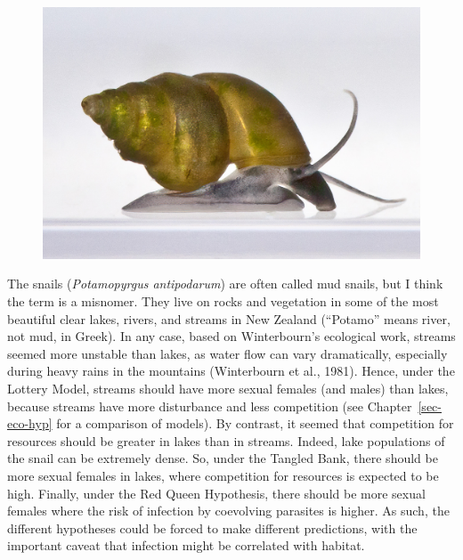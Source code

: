 \documentclass[
  letterpaper,
]{book}
\begin{document}
\begin{figure}


{\centering \includegraphics{images/fig3-4.jpeg}

}

\end{figure}

The snails (\emph{Potamopyrgus antipodarum}) are often called mud
snails, but I think the term is a misnomer. They live on rocks and
vegetation in some of the most beautiful clear lakes, rivers, and
streams in New Zealand (``Potamo'' means river, not mud, in Greek). In
any case, based on Winterbourn's ecological work, streams seemed more
unstable than lakes, as water flow can vary dramatically, especially
during heavy rains in the mountains (Winterbourn et al., 1981). Hence,
under the Lottery Model, streams should have more sexual females (and
males) than lakes, because streams have more disturbance and less
competition (see Chapter~\ref{sec-eco-hyp} for a comparison of models).
By contrast, it seemed that competition for resources should be greater
in lakes than in streams. Indeed, lake populations of the snail can be
extremely dense. So, under the Tangled Bank, there should be more sexual
females in lakes, where competition for resources is expected to be
high. Finally, under the Red Queen Hypothesis, there should be more
sexual females where the risk of infection by coevolving parasites is
higher. As such, the different hypotheses could be forced to make
different predictions, with the important caveat that infection might be
correlated with habitat.
\end{document}
